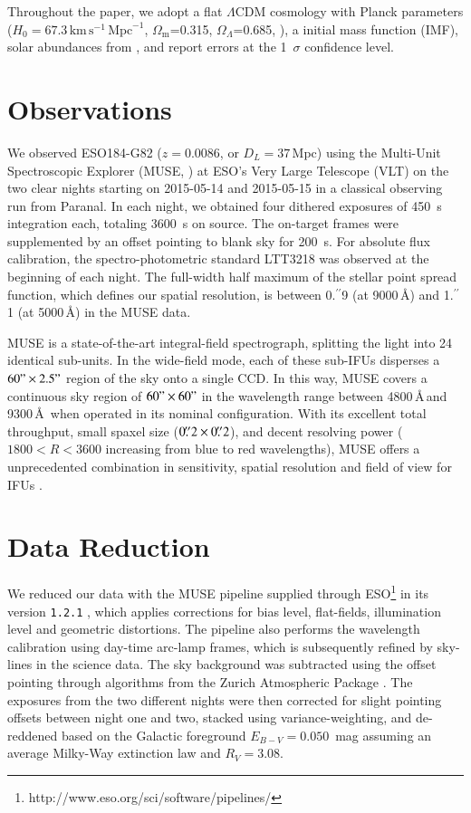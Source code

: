\documentclass[traditabstract]{aa}
\newcommand{\farc}{\hbox{$.\!\!^{\prime\prime}$}}
\begin{document}
Throughout the paper, we adopt a flat $\Lambda$CDM cosmology with Planck parameters ($H_0=67.3\,\mathrm{km}\,\mathrm{s}^{-1}\,\mathrm{Mpc}^{-1}$, $\Omega_\mathrm{m}$=0.315, $\Omega_\Lambda$=0.685, \citealt{2014A&A...571A..16P}), a \citet{2003PASP..115..763C} initial mass function (IMF), solar abundances from \citet{2009ARA&A..47..481A}, and report errors at the 1~$\sigma$ confidence level.

\section{Observations}

We observed ESO184-G82 ($z=0.0086$, or $D_L=37$\,Mpc) using the Multi-Unit Spectroscopic Explorer (MUSE, \citealp{2010SPIE.7735E..08B}) at ESO's Very Large Telescope (VLT) on the two clear nights starting on 2015-05-14 and 2015-05-15 in a classical observing run from Paranal. In each night, we obtained four dithered exposures of 450~s integration each, totaling 3600~s on source. The on-target frames were supplemented by an offset pointing to blank sky for 200~s. For absolute flux calibration, the spectro-photometric standard LTT3218 was observed at the beginning of each night. The full-width half maximum of the stellar point spread function, which defines our spatial resolution, is between 0\farc{9} (at 9000\,\AA) and 1\farc{1} (at 5000\,\AA) in the MUSE data.

MUSE is a state-of-the-art integral-field spectrograph, splitting the light into 24 identical sub-units. In the wide-field mode, each of these sub-IFUs disperses a $60"\times 2.5"$ region of the sky onto a single CCD. In this way, MUSE covers a continuous sky region of $60"\times 60"$ in the wavelength range between 4800\,\AA\,and 9300\,\AA\, when operated in its nominal configuration. With its excellent total throughput, small spaxel size ($0\farc{2} \times 0\farc{2}$), and decent resolving power ($1800 < R < 3600$ increasing from blue to red wavelengths), MUSE offers a unprecedented combination in sensitivity, spatial resolution and field of view for IFUs \citep{2010SPIE.7735E..08B}.

\section{Data Reduction}

We reduced our data with the MUSE pipeline supplied through ESO\footnote{http://www.eso.org/sci/software/pipelines/} in its version \texttt{1.2.1} \citep{2014ASPC..485..451W}, which applies corrections for bias level, flat-fields, illumination level and geometric distortions. The pipeline also performs the wavelength calibration using day-time arc-lamp frames, which is subsequently refined by sky-lines in the science data. The sky background was subtracted using the offset pointing through algorithms from the Zurich Atmospheric Package \citep{2016MNRAS.458.3210S}. The exposures from the two different nights were then corrected for slight pointing offsets between night one and two, stacked using variance-weighting, and de-reddened based on the Galactic foreground $E_{B-V}=0.050$~mag \citep{2011ApJ...737..103S} assuming an average Milky-Way extinction law \citep{1992ApJ...395..130P} and $R_V=3.08$. 
\end{document}
